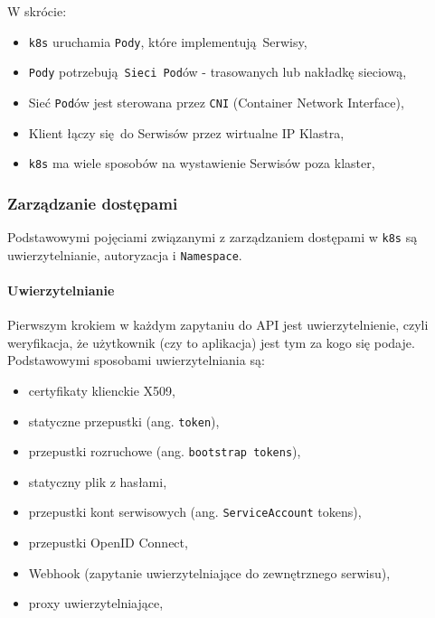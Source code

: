 \documentclass[a4paper,12pt,twoside,openany]{report}
\providecommand{\tightlist}{%
  \setlength{\itemsep}{0pt}\setlength{\parskip}{0pt}}
\newcommand{\passthrough}[1]{#1}
\begin{document}
W skrócie:

\begin{itemize}
\tightlist
\item
  \passthrough{\lstinline!k8s!} uruchamia
  \passthrough{\lstinline!Pody!}, które implementują~Serwisy,
\item
  \passthrough{\lstinline!Pody!}
  potrzebują~\passthrough{\lstinline!Sieci Pod!}ów - trasowanych lub
  nakładkę sieciową,
\item
  Sieć \passthrough{\lstinline!Pod!}ów jest sterowana przez
  \passthrough{\lstinline!CNI!} (Container Network Interface),
\item
  Klient łączy się~do Serwisów przez wirtualne IP Klastra,
\item
  \passthrough{\lstinline!k8s!} ma wiele sposobów na wystawienie
  Serwisów poza klaster,
\end{itemize}

\hypertarget{zarzux105dzanie-dostux119pami}{%
\subsubsection{Zarządzanie
dostępami}\label{zarzux105dzanie-dostux119pami}}

Podstawowymi pojęciami związanymi z zarządzaniem dostępami w
\passthrough{\lstinline!k8s!} są uwierzytelnianie, autoryzacja i
\passthrough{\lstinline!Namespace!}.

\hypertarget{uwierzytelnianie}{%
\paragraph{Uwierzytelnianie}\label{uwierzytelnianie}}

Pierwszym krokiem w każdym zapytaniu do API jest uwierzytelnienie, czyli
weryfikacja, że użytkownik (czy to aplikacja) jest tym za kogo się
podaje. Podstawowymi sposobami uwierzytelniania są:

\begin{itemize}
\tightlist
\item
  certyfikaty klienckie X509,
\item
  statyczne przepustki (ang. \passthrough{\lstinline!token!}),
\item
  przepustki rozruchowe (ang.
  \passthrough{\lstinline!bootstrap tokens!}),
\item
  statyczny plik z hasłami,
\item
  przepustki kont serwisowych (ang.
  \passthrough{\lstinline!ServiceAccount!} tokens),
\item
  przepustki OpenID Connect,
\item
  Webhook (zapytanie uwierzytelniające do zewnętrznego serwisu),
\item
  proxy uwierzytelniające,
\end{itemize}
\end{document}

